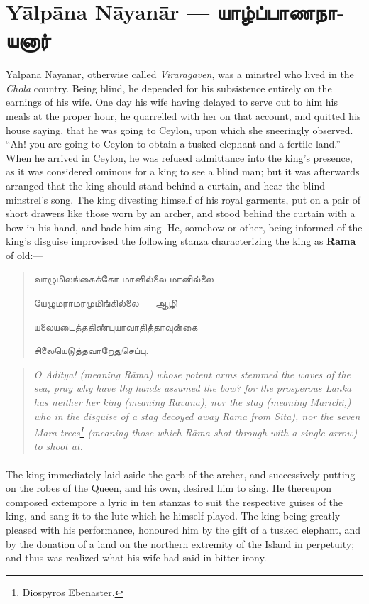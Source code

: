 \documentclass{article}
\newcommand{\TamilText}[1]{\texttamil{#1}}
\newcommand{\TamilBold}[1]{\texttamil{\textbf{#1}}}
\newcommand{\tam}[1]{\TamilText{#1}}
\newcommand{\tambold}[1]{\TamilBold{#1}}
\begin{document}
\section{Y\={a}lp\={a}na N\={a}yan\={a}r --- \tambold{யாழ்ப்பாணநாயனார்}}
\paragraph{}
Y\={a}lp\={a}na N\={a}yan\={a}r, otherwise called \emph{Virar\={a}gaven}, was a minstrel who lived in the \emph{Chola} country. Being blind, he depended for his subsistence entirely on the earnings of his wife. One day his wife having delayed to serve out to him his meals at the proper hour, he quarrelled with her on that account, and quitted his house saying, that he was going to Ceylon, upon which she sneeringly observed. ``Ah! you are going to Ceylon to obtain a tusked elephant and a fertile land.'' When he arrived in Ceylon, he was refused admittance into the king's presence, as it was considered ominous for a king to see a blind man; but it was afterwards arranged that the king should stand behind a curtain, and hear the blind minstrel's song. The king divesting himself of his royal garments, put on a pair of short drawers like those worn by an archer, and stood behind the curtain with a bow in his hand, and bade him sing. He, somehow or other, being informed of the king's disguise improvised the following stanza characterizing the king as \textbf{R\={a}m\={a}} of old:---
\begin{quotation}\small
\tam{வாழுமிலங்கைக்கோ மானில்லை மானில்லை}

\tam{யேழுமராமரமுமிங்கில்‌லை} --- \tam{ஆழி}

\tam{யலையடைத்ததிண்புயாவாதித்தாவுன்கை}

\tam{சிலையெடுத்தவாறேதுசெப்பு}.
\end{quotation}
\begin{quotation}\small
\emph{O Aditya! (meaning R\={a}ma) whose potent arms stemmed the waves of the sea, pray why have thy hands assumed the bow? for the prosperous Lanka has neither her king (meaning R\={a}vana), nor the stag (meaning M\={a}richi,) who in the disguise of a stag decoyed away R\={a}ma from Sita), nor the seven Mara trees\footnote{Diospyros Ebenaster.} (meaning those which R\={a}ma shot through with a single arrow) to shoot at.}
\end{quotation}
\paragraph{}
The king immediately laid aside the garb of the archer, and successively putting on the robes of the Queen, and his own, desired him to sing. He thereupon composed extempore a lyric in ten stanzas to suit the respective guises of the king, and sang it to the lute which he himself played. The king being greatly pleased with his performance, honoured him by the gift of a tusked elephant, and by the donation of a land on the northern extremity of the Island in perpetuity; and thus was realized what his wife had said in bitter irony.
\end{document}
